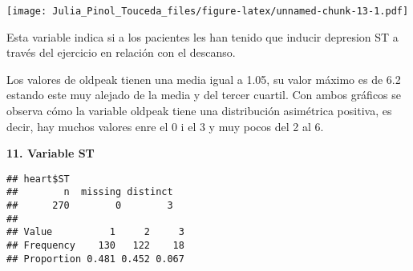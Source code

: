 \documentclass[]{article}
\newenvironment{Shaded}{\begin{snugshade}}{\end{snugshade}}
\newcommand{\KeywordTok}[1]{\textcolor[rgb]{0.13,0.29,0.53}{\textbf{#1}}}
\newcommand{\DataTypeTok}[1]{\textcolor[rgb]{0.13,0.29,0.53}{#1}}
\newcommand{\DecValTok}[1]{\textcolor[rgb]{0.00,0.00,0.81}{#1}}
\newcommand{\StringTok}[1]{\textcolor[rgb]{0.31,0.60,0.02}{#1}}
\newcommand{\OperatorTok}[1]{\textcolor[rgb]{0.81,0.36,0.00}{\textbf{#1}}}
\newcommand{\NormalTok}[1]{#1}
\begin{document}
\begin{Shaded}
\end{Shaded}

\texttt{[image: Julia\_Pinol\_Touceda\_files/figure-latex/unnamed-chunk-13-1.pdf]}

Esta variable indica si a los pacientes les han tenido que inducir
depresion ST a través del ejercicio en relación con el descanso.

Los valores de oldpeak tienen una media igual a 1.05, su valor máximo es
de 6.2 estando este muy alejado de la media y del tercer cuartil. Con
ambos gráficos se observa cómo la variable oldpeak tiene una
distribución asimétrica positiva, es decir, hay muchos valores enre el 0
i el 3 y muy pocos del 2 al 6.

\textbf{11. Variable ST}

\begin{Shaded}
\end{Shaded}

\begin{verbatim}
## heart$ST 
##        n  missing distinct 
##      270        0        3 
##                             
## Value          1     2     3
## Frequency    130   122    18
## Proportion 0.481 0.452 0.067
\end{verbatim}

\begin{Shaded}
\end{Shaded}
\end{document}
